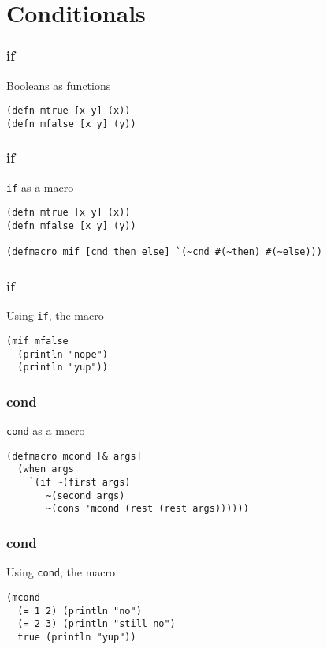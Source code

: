 \documentclass[aspectratio=169]{beamer}
\begin{document}
  \section{Conditionals}
  \begin{frame}[fragile]
    \frametitle{if}
    \begin{listing}[H]
      \caption{Booleans as functions}
      \begin{verbatim}
(defn mtrue [x y] (x))
(defn mfalse [x y] (y))
      \end{verbatim}
    \end{listing}
  \end{frame}
  \begin{frame}[fragile]
    \frametitle{if}
    \begin{listing}[H]
      \caption{\texttt{if} as a macro}
      \begin{verbatim}
(defn mtrue [x y] (x))
(defn mfalse [x y] (y))

(defmacro mif [cnd then else] `(~cnd #(~then) #(~else)))
      \end{verbatim}
    \end{listing}
  \end{frame}
  \begin{frame}[fragile]
    \frametitle{if}
    \begin{listing}[H]
      \caption{Using \texttt{if}, the macro}
      \begin{verbatim}
(mif mfalse
  (println "nope")
  (println "yup"))
      \end{verbatim}
    \end{listing}
  \end{frame}
  \begin{frame}[fragile]
    \frametitle{cond}
    \begin{listing}[H]
      \caption{\texttt{cond} as a macro}
      \begin{verbatim}
(defmacro mcond [& args]
  (when args
    `(if ~(first args)
       ~(second args)
       ~(cons 'mcond (rest (rest args))))))
      \end{verbatim}
    \end{listing}
  \end{frame}
  \begin{frame}[fragile]
    \frametitle{cond}
    \begin{listing}[H]
      \caption{Using \texttt{cond}, the macro}
      \begin{verbatim}
(mcond
  (= 1 2) (println "no")
  (= 2 3) (println "still no")
  true (println "yup"))
      \end{verbatim}
    \end{listing}
  \end{frame}
\end{document}
